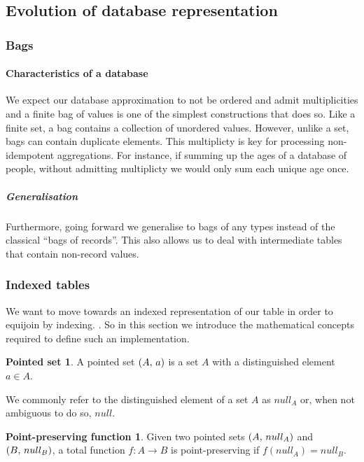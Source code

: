 \subsection{Evolution of database representation}
\subsubsection{Bags}
\paragraph{Characteristics of a database}We expect our database approximation to not be ordered and admit multiplicities and a finite bag of values is one of the simplest constructions that does so. Like a finite set, a bag contains a collection of unordered values. However, unlike a set, bags can contain duplicate elements. \cite{RelationalAlgebraByWayOfAdjunctions} This multiplicty is key for processing non-idempotent aggregations. For instance, if summing up the ages of a database of people, without admitting multiplicty we would only sum each unique age once.
\subparagraph{Generalisation}Furthermore, going forward we generalise to bags of any types instead of the classical ``bags of records''. This also allows us to deal with intermediate tables that contain non-record values.

\subsubsection{Indexed tables}
We want to move towards an indexed representation of our table in order to equijoin by indexing. . So in this section we introduce the mathematical concepts required to define such an implementation.
\theoremstyle{definition}\newtheorem*{psetdef}{Pointed set}
\theoremstyle{definition}\newtheorem*{ppfuncdef}{Point-preserving function}
\theoremstyle{definition}\newtheorem*{mapdef}{Map}
\theoremstyle{definition}\newtheorem*{finitemapdef}{Finite map}
\begin{psetdef}\label{def:pset}
  A pointed set $\left(A,\,a\right)$ is a set $A$ with a distinguished element $a \in A$.
\end{psetdef}
We commonly refer to the distinguished element of a set $A$ as $null_A$ or, when not ambiguous to do so, $null$.
\begin{ppfuncdef}\label{def:ppfunc}
  Given two pointed sets $\left(A,\,null_A\right)$ and $\left(B,\,null_B\right)$, a total function $f: A \rightarrow B$ is point-preserving if $f(null_A) = null_B$.
\end{ppfuncdef}

